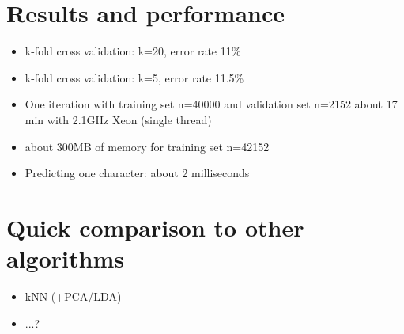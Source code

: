 \documentclass{netsec2012}
\begin{document}

\section{Results and performance}

\label{ref:datachallenge}

\begin{itemize}
\item k-fold cross validation: k=20, error rate 11\%
\item k-fold cross validation: k=5, error rate 11.5\%
\item One iteration with training set n=40000 and validation set n=2152 about 17 min with 2.1GHz Xeon (single thread)
\item about 300MB of memory for training set n=42152
\item Predicting one character: about 2 milliseconds

\end{itemize}

\section{Quick comparison to other algorithms}

\begin{itemize}
\item kNN (+PCA/LDA)
\item ...?
\end{itemize}


\cite{albanese12mlpy}



\end{document}
